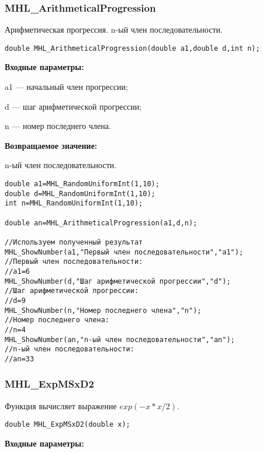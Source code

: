 \documentclass[a4paper,12pt]{article}
\begin{document}
\subsubsection{MHL\_ArithmeticalProgression}\label{MHL_ArithmeticalProgression}

Арифметическая прогрессия. n-ый член последовательности.


\begin{lstlisting}[label=code_syntax_MHL_ArithmeticalProgression,caption=Синтаксис]
double MHL_ArithmeticalProgression(double a1,double d,int n);
\end{lstlisting}

\textbf{Входные параметры:}  
 
a1 --- начальный член прогрессии;
 
d --- шаг арифметической прогрессии;
 
n --- номер последнего члена.

\textbf{Возвращаемое значение:}
 
n-ый член последовательности.


\begin{lstlisting}[label=code_use_MHL_ArithmeticalProgression,caption=Пример использования]
double a1=MHL_RandomUniformInt(1,10);
double d=MHL_RandomUniformInt(1,10);
int n=MHL_RandomUniformInt(1,10);

double an=MHL_ArithmeticalProgression(a1,d,n);

//Используем полученный результат
MHL_ShowNumber(a1,"Первый член последовательности","a1");
//Первый член последовательности:
//a1=6
MHL_ShowNumber(d,"Шаг арифметической прогрессии","d");
//Шаг арифметической прогрессии:
//d=9
MHL_ShowNumber(n,"Номер последнего члена","n");
//Номер последнего члена:
//n=4
MHL_ShowNumber(an,"n-ый член последовательности","an");
//n-ый член последовательности:
//an=33
\end{lstlisting}

\subsubsection{MHL\_ExpMSxD2}\label{MHL_ExpMSxD2}

Функция вычисляет выражение $exp(-x*x/2)$.


\begin{lstlisting}[label=code_syntax_MHL_ExpMSxD2,caption=Синтаксис]
double MHL_ExpMSxD2(double x);
\end{lstlisting}

\textbf{Входные параметры:}
\end{document}
